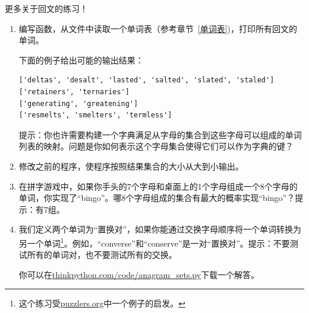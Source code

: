 \begin{ex}
\label{回文}


更多关于回文的练习！

\begin{enumerate}

\item 编写函数，从文件中读取一个单词表（参考章节~\ref{单词表})，打印所有回文的单词。

下面的例子给出可能的输出结果：

\beforeverb
\begin{verbatim}
['deltas', 'desalt', 'lasted', 'salted', 'slated', 'staled']
['retainers', 'ternaries']
['generating', 'greatening']
['resmelts', 'smelters', 'termless']
\end{verbatim}
\afterverb
%
提示：你也许需要构建一个字典满足从字母的集合到这些字母可以组成的单词列表的映射。问题是你如何表示这个字母集合使得它们可以作为字典的键？

\item 修改之前的程序，使程序按照结果集合的大小从大到小输出。


\item 在拼字游戏中，如果你手头的7个字母和桌面上的1个字母组成一个8个字母的单词，你实现了“bingo”。哪8个字母组成的集合有最大的概率实现“bingo”？提示：有7组。



\item 我们定义两个单词为“置换对”，如果你能通过交换字母顺序将一个单词转换为另一个单词\footnote{这个练习受\url{puzzlers.org}中一个例子的启发。}。例如，“converse”和“conserve”是一对“置换对”。提示：不要测试所有的单词对，也不要测试所有的交换。

你可以在\url{thinkpython.com/code/anagram_sets.py}下载一个解答。

\end{enumerate}
\end{ex}



